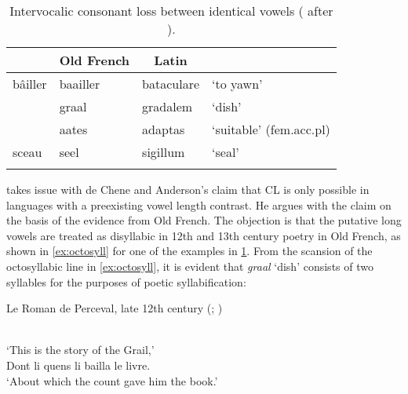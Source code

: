 \documentclass[output=paper,
modfonts
]{LSP/langsci}
\begin{document}
\begin{table}
\begin{tabular}{llll}
\lsptoprule
\multicolumn{1}{c}{Modern French} & \multicolumn{1}{c}{Old French} & \multicolumn{1}{c}{Latin} & \\
\midrule
bâiller	& baailler 	& bataculare 	& `to yawn'\\
		& graal 	& gradalem 	& `dish' \\
		& aates 	& adaptas 	& `suitable' (fem.acc.pl)\\
sceau 	& seel 	& sigillum 		& `seal'\\
\lspbottomrule
\end{tabular}
\caption{Intervocalic consonant loss between identical vowels (\citealt{deChene1979} after \citealt{pope1934}).}
\label{tab:VCVloss}
\end{table}

\citet{gess1998} takes issue with de Chene and Anderson's claim that CL is
only possible in languages with a preexisting vowel length contrast. He
argues with the claim on the basis of the evidence from Old French. The
objection is that the putative long vowels are treated as disyllabic in
12th and 13th century poetry in Old
French, as shown in \cref{ex:octosyll} for one of the examples in \cref{tab:VCVloss}. From the
scansion of the octosyllabic line in \cref{ex:octosyll}, it is evident that
\emph{graal} `dish' consists of two syllables for the purposes of poetic
syllabification:

\ea\label{ex:octosyll}Le Roman de Perceval, late 12th century (\citealt[3, 11, 76--77]{roach1959}; \citealt[357]{gess1998})\\
\\
`This is the story of the Grail,'\\
Dont li quens li bailla le livre.\\
`About which the count gave him the book.'
\z
\end{document}
